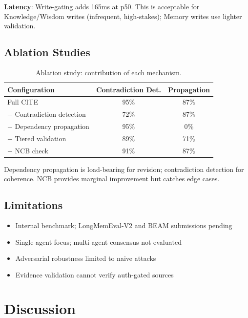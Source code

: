 \documentclass[11pt,a4paper]{article}
\begin{document}
\textbf{Latency}: Write-gating adds 165ms at p50. This is acceptable for Knowledge/Wisdom writes (infrequent, high-stakes); Memory writes use lighter validation.

\subsection{Ablation Studies}

\begin{table}[H]
\centering
\caption{Ablation study: contribution of each mechanism.}
\label{tab:ablation}
\begin{tabular}{@{}lcc@{}}
\toprule
\textbf{Configuration} & \textbf{Contradiction Det.} & \textbf{Propagation} \\
\midrule
Full CITE & 95\% & 87\% \\
$-$ Contradiction detection & 72\% & 87\% \\
$-$ Dependency propagation & 95\% & 0\% \\
$-$ Tiered validation & 89\% & 71\% \\
$-$ NCB check & 91\% & 87\% \\
\bottomrule
\end{tabular}
\end{table}

Dependency propagation is load-bearing for revision; contradiction detection for coherence. NCB provides marginal improvement but catches edge cases.

\subsection{Limitations}

\begin{itemize}[noitemsep]
    \item Internal benchmark; LongMemEval-V2 and BEAM submissions pending
    \item Single-agent focus; multi-agent consensus not evaluated
    \item Adversarial robustness limited to naive attacks
    \item Evidence validation cannot verify auth-gated sources
\end{itemize}

\section{Discussion}
\label{sec:discussion}
\end{document}
